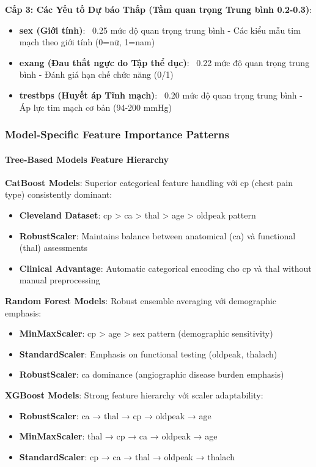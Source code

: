 \textbf{Cấp 3: Các Yếu tố Dự báo Thấp (Tầm quan trọng Trung bình 0.2-0.3)}:
\begin{itemize}
    \item \textbf{sex (Giới tính)}: ~0.25 mức độ quan trọng trung bình - Các kiểu mẫu tim mạch theo giới tính (0=nữ, 1=nam)
    \item \textbf{exang (Đau thắt ngực do Tập thể dục)}: ~0.22 mức độ quan trọng trung bình - Đánh giá hạn chế chức năng (0/1)
    \item \textbf{trestbps (Huyết áp Tĩnh mạch)}: ~0.20 mức độ quan trọng trung bình - Áp lực tim mạch cơ bản (94-200 mmHg)
\end{itemize}

\subsubsection{Model-Specific Feature Importance Patterns}

\paragraph{Tree-Based Models Feature Hierarchy}

\textbf{CatBoost Models}: Superior categorical feature handling với cp (chest pain type) consistently dominant:
\begin{itemize}
    \item \textbf{Cleveland Dataset}: cp > ca > thal > age > oldpeak pattern
    \item \textbf{RobustScaler}: Maintains balance between anatomical (ca) và functional (thal) assessments  
    \item \textbf{Clinical Advantage}: Automatic categorical encoding cho cp và thal without manual preprocessing
\end{itemize}

\textbf{Random Forest Models}: Robust ensemble averaging với demographic emphasis:
\begin{itemize}
    \item \textbf{MinMaxScaler}: cp > age > sex pattern (demographic sensitivity)
    \item \textbf{StandardScaler}: Emphasis on functional testing (oldpeak, thalach)
    \item \textbf{RobustScaler}: ca dominance (angiographic disease burden emphasis)
\end{itemize}

\textbf{XGBoost Models}: Strong feature hierarchy với scaler adaptability:
\begin{itemize}
    \item \textbf{RobustScaler}: ca → thal → cp → oldpeak → age
    \item \textbf{MinMaxScaler}: thal → cp → ca → oldpeak → age
    \item \textbf{StandardScaler}: cp → ca → thal → oldpeak → thalach
\end{itemize}

